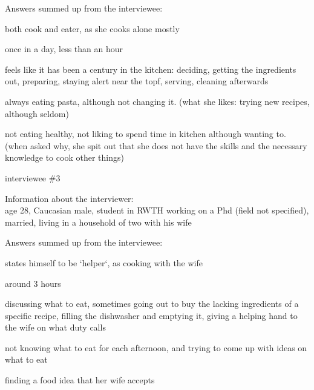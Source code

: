 \documentclass[a4paper,11pt,oneside]{scrreprt}
\begin{document}
\begin{compactitem}
\begin{compactitem}
				\item Answers summed up from the interviewee:
				\begin{compactenum}
					\item both cook and eater, as she cooks alone mostly
					\item once in a day, less than an hour
					\item feels like it has been a century in the kitchen: deciding, getting the ingredients out, preparing, staying alert near the topf, serving, cleaning afterwards
					\item always eating pasta, although not changing it. (what she likes: trying new recipes, although seldom)
					\item not eating healthy, not liking to spend time in kitchen although wanting to. (when asked why, she spit out that she does not have the skills and the necessary knowledge to cook other things)
				\end{compactenum}
				
				
			\end{compactitem}
		
			\bigskip
			
			\item interviewee \#3
			\begin{compactitem}
				\item Information about the interviewer: \\
				age 28, Caucasian male, student in RWTH working on a Phd (field not specified), married, living in a household of two with his wife\\
				
				\item Answers summed up from the interviewee:
				\begin{compactenum}
					\item states himself to be `helper`, as cooking with the wife
					\item around 3 hours
					\item discussing what to eat, sometimes going out to buy the lacking ingredients of a specific recipe, filling the dishwasher and emptying it, giving a helping hand to the wife on what duty calls
					\item not knowing what to eat for each afternoon, and trying to come up with ideas on what to eat
					\item finding a food idea that her wife accepts
				\end{compactenum}
				
				
			\end{compactitem}
		\end{compactitem}
		
\end{document}
